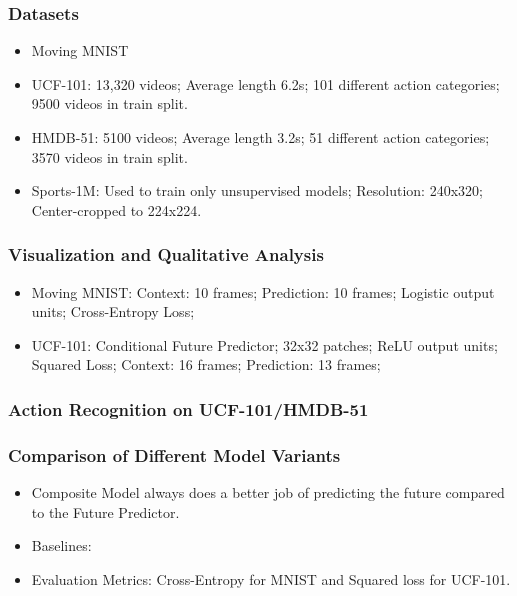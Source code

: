 \documentclass{article}
\begin{document}
    \subsubsection{Datasets}\label{subsubsec:Unsupervised_Learning_of_Video_Representations_using_LSTMs:datasets}
    \begin{itemize}
        \item Moving MNIST
        \item UCF-101: 13,320 videos;
        Average length 6.2s;
        101 different action categories;
        9500 videos in train split.
        \item HMDB-51: 5100 videos;
        Average length 3.2s;
        51 different action categories;
        3570 videos in train split.
        \item Sports-1M: Used to train only unsupervised models;
        Resolution: 240x320;
        Center-cropped to 224x224.
    \end{itemize}

    \subsubsection{Visualization and Qualitative Analysis}\label{subsubsec:Unsupervised_Learning_of_Video_Representations_using_LSTMs:visualization-and-qualitative-analysis}
    \begin{itemize}
        \item Moving MNIST: Context: 10 frames;
        Prediction: 10 frames;
        Logistic output units;
        Cross-Entropy Loss;
        \item UCF-101: Conditional Future Predictor;
        32x32 patches;
        ReLU output units;
        Squared Loss;
        Context: 16 frames;
        Prediction: 13 frames;
    \end{itemize}

    \subsubsection{Action Recognition on UCF-101/HMDB-51}\label{subsubsec:Unsupervised_Learning_of_Video_Representations_using_LSTMs:action-recognition}

    \subsubsection{Comparison of Different Model Variants}\label{subsubsec:Unsupervised_Learning_of_Video_Representations_using_LSTMs:comparison-of-different-model-variants}
    \begin{itemize}
        \item Composite Model always does a better job of predicting the future compared to the Future Predictor.
    \end{itemize}
    \begin{itemize}
        \item Baselines:
        \item Evaluation Metrics: Cross-Entropy for MNIST and Squared loss for UCF-101.
    \end{itemize}
    \newpage
\end{document}
